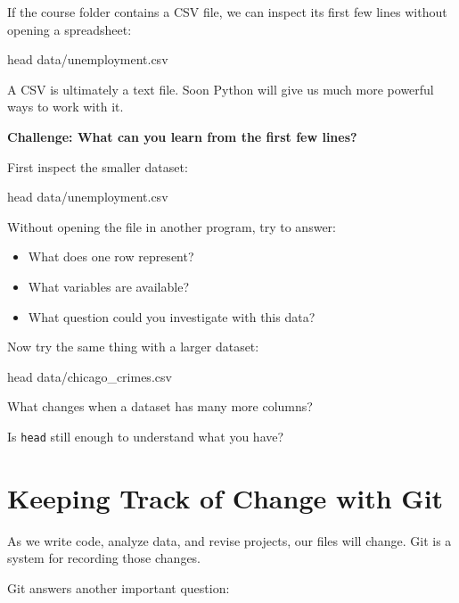 \documentclass[11pt]{article}
\begin{document}
If the course folder contains a CSV file, we can inspect its first few lines
without opening a spreadsheet:

\begin{terminal}
head data/unemployment.csv
\end{terminal}

A CSV is ultimately a text file. Soon Python will give us much more powerful
ways to work with it.

\begin{checkpoint}
\textbf{Challenge: What can you learn from the first few lines?}

First inspect the smaller dataset:

\begin{terminal}
head data/unemployment.csv
\end{terminal}

Without opening the file in another program, try to answer:

\begin{itemize}[leftmargin=*]
    \item What does one row represent?
    \item What variables are available?
    \item What question could you investigate with this data?
\end{itemize}

Now try the same thing with a larger dataset:

\begin{terminal}
head data/chicago_crimes.csv
\end{terminal}

What changes when a dataset has many more columns?

\vspace{0.35in}

Is \texttt{head} still enough to understand what you have?

\vspace{0.35in}
\end{checkpoint}

\newpage

\section{Keeping Track of Change with Git}

As we write code, analyze data, and revise projects, our files will change.
Git is a system for recording those changes.

Git answers another important question:
\end{document}
